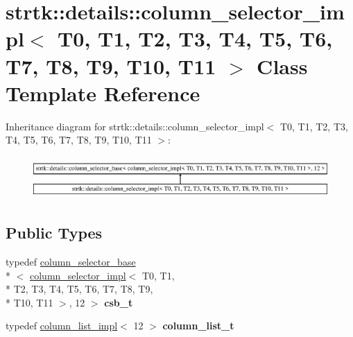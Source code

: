 \hypertarget{classstrtk_1_1details_1_1column__selector__impl}{\section{strtk\-:\-:details\-:\-:column\-\_\-selector\-\_\-impl$<$ T0, T1, T2, T3, T4, T5, T6, T7, T8, T9, T10, T11 $>$ Class Template Reference}
\label{classstrtk_1_1details_1_1column__selector__impl}
}
Inheritance diagram for strtk\-:\-:details\-:\-:column\-\_\-selector\-\_\-impl$<$ T0, T1, T2, T3, T4, T5, T6, T7, T8, T9, T10, T11 $>$\-:\begin{figure}[H]
\begin{center}
\leavevmode
\includegraphics[height=1.623188cm]{classstrtk_1_1details_1_1column__selector__impl}
\end{center}
\end{figure}
\subsection*{Public Types}
\begin{DoxyCompactItemize}
\item 
\hypertarget{classstrtk_1_1details_1_1column__selector__impl_a04649fa5da0c1fcd0c3ed9343fc79395}{typedef \hyperlink{classstrtk_1_1details_1_1column__selector__base}{column\-\_\-selector\-\_\-base}\\*
$<$ \hyperlink{classstrtk_1_1details_1_1column__selector__impl}{column\-\_\-selector\-\_\-impl}$<$ T0, T1, \\*
T2, T3, T4, T5, T6, T7, T8, T9, \\*
T10, T11 $>$, 12 $>$ {\bfseries csb\-\_\-t}}\label{classstrtk_1_1details_1_1column__selector__impl_a04649fa5da0c1fcd0c3ed9343fc79395}

\item 
\hypertarget{classstrtk_1_1details_1_1column__selector__impl_ac2479e8ad60fbe76baf41f5a050d282c}{typedef \hyperlink{structstrtk_1_1details_1_1column__list__impl}{column\-\_\-list\-\_\-impl}$<$ 12 $>$ {\bfseries column\-\_\-list\-\_\-t}}\label{classstrtk_1_1details_1_1column__selector__impl_ac2479e8ad60fbe76baf41f5a050d282c}

\end{DoxyCompactItemize}
